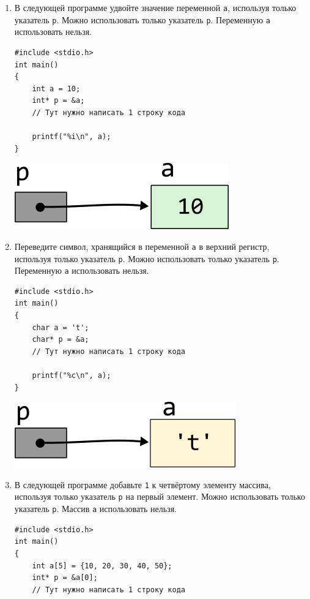 \documentclass[10pt]{article}
\begin{document}
\begin{enumerate}
\newpage
\item В следующей программе удвойте значение переменной \texttt{a}, используя только указатель \texttt{p}. Можно использовать только указатель \texttt{p}. Переменную \texttt{a} использовать нельзя.
\begin{multicols}{2}\noindent
\begin{lstlisting}
#include <stdio.h>
int main() 
{
    int a = 10;
    int* p = &a;
    // Тут нужно написать 1 строку кода
    
    printf("%i\n", a);
}
\end{lstlisting}
\vfill \null    
\columnbreak
\vfill \null 
\begin{center}
\includegraphics[scale=1]{../images/pointer_schemes/pointer_to_int.png}
\end{center}
\end{multicols}


\item Переведите символ, хранящийся в переменной \texttt{a} в верхний регистр, используя только указатель \texttt{p}. Можно использовать только указатель \texttt{p}. Переменную \texttt{a} использовать нельзя.
\begin{multicols}{2}\noindent
\begin{lstlisting}
#include <stdio.h>
int main() 
{
    char a = 't';
    char* p = &a;
    // Тут нужно написать 1 строку кода
    
    printf("%c\n", a);
}
\end{lstlisting}
\vfill \null    
\columnbreak
\vfill \null 
\begin{center}
\includegraphics[scale=1]{../images/pointer_schemes/pointer_to_char.png}
\end{center}
\end{multicols}


\item В следующей программе добавьте \texttt{1} к четвёртому элементу массива, используя только указатель \texttt{p} на первый элемент. Можно использовать только указатель \texttt{p}. Массив \texttt{a} использовать нельзя.
\begin{multicols}{2}\noindent
\begin{lstlisting}
#include <stdio.h>
int main() 
{
    int a[5] = {10, 20, 30, 40, 50};
    int* p = &a[0];
    // Тут нужно написать 1 строку кода
    

\end{lstlisting}
\end{multicols}
\end{enumerate}
\end{document}
